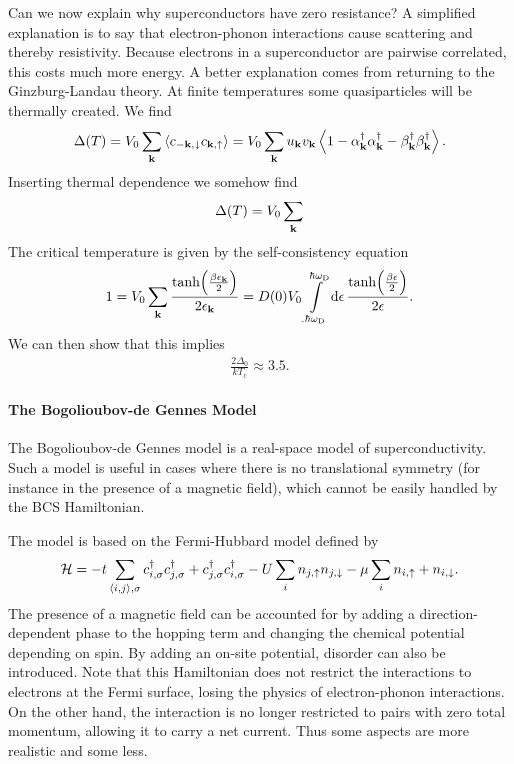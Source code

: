Can we now explain why superconductors have zero resistance? A simplified explanation is to say that electron-phonon interactions cause scattering and thereby resistivity. Because electrons in a superconductor are pairwise correlated, this costs much more energy. A better explanation comes from returning to the Ginzburg-Landau theory. At finite temperatures some quasiparticles will be thermally created. We find
\begin{align*}
	\Delta(T) = V_{0}\sum\limits_{\vb{k}}\expval{c_{-\vb{k}, \downarrow}c_{\vb{k}, \uparrow}} = V_{0}\sum\limits_{\vb{k}}u_{\vb{k}}v_{\vb{k}}\expval{1 - \alpha_{\vb{k}}\ensuremath{^{\dagger}}\alpha_{\vb{k}}\ensuremath{^{\dagger}}- \beta_{\vb{k}}\ensuremath{^{\dagger}}\beta_{\vb{k}}\ensuremath{^{\dagger}}}.
\end{align*}
Inserting thermal dependence we somehow find
\begin{align*}
	\Delta(T) = V_{0}\sum\limits_{\vb{k}}
\end{align*}
The critical temperature is given by the self-consistency equation
\begin{align*}
	1 = V_{0}\sum\limits_{\vb{k}}\frac{\tanh(\frac{\beta\epsilon_{\vb{k}}}{2})}{2\epsilon_{\vb{k}}} = D(0)V_{0}\int\limits_{.\hbar\omega_{\text{D}}}^{\hbar\omega_{\text{D}}}\dd{\epsilon}\frac{\tanh(\frac{\beta\epsilon}{2})}{2\epsilon}.
\end{align*}
We can then show that this implies
\begin{align*}
	\frac{2\Delta_{0}}{kT_{\text{c}}} \approx 3.5.
\end{align*}

\paragraph{The Bogolioubov-de Gennes Model}
The Bogolioubov-de Gennes model is a real-space model of superconductivity. Such a model is useful in cases where there is no translational symmetry (for instance in the presence of a magnetic field), which cannot be easily handled by the BCS Hamiltonian.

The model is based on the Fermi-Hubbard model defined by
\begin{align*}
	\mathcal{H} = -t\sum\limits_{\expval{i, j}, \sigma}c_{i, \sigma}^{\dagger} c_{j, \sigma}^{\dagger} + c_{j, \sigma}^{\dagger} c_{i, \sigma}^{\dagger} - U\sum\limits_{i}n_{j, \uparrow}n_{j, \downarrow} - \mu\sum\limits_{i}n_{i, \uparrow} + n_{i, \downarrow}.
\end{align*}
The presence of a magnetic field can be accounted for by adding a direction-dependent phase to the hopping term and changing the chemical potential depending on spin. By adding an on-site potential, disorder can also be introduced. Note that this Hamiltonian does not restrict the interactions to electrons at the Fermi surface, losing the physics of electron-phonon interactions. On the other hand, the interaction is no longer restricted to pairs with zero total momentum, allowing it to carry a net current. Thus some aspects are more realistic and some less.

